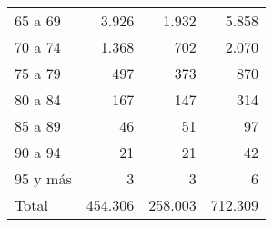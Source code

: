 \begin{tabular}{llll}
\multicolumn{1}{l}{\hspace{1em}65 a 69} &
  \multicolumn{1}{|r}{3.926} &
  \multicolumn{1}{r}{1.932} &
  \multicolumn{1}{r}{5.858} \\
\multicolumn{1}{l}{\hspace{1em}70 a 74} &
  \multicolumn{1}{|r}{1.368} &
  \multicolumn{1}{r}{702} &
  \multicolumn{1}{r}{2.070} \\
\multicolumn{1}{l}{\hspace{1em}75 a 79} &
  \multicolumn{1}{|r}{497} &
  \multicolumn{1}{r}{373} &
  \multicolumn{1}{r}{870} \\
\multicolumn{1}{l}{\hspace{1em}80 a 84} &
  \multicolumn{1}{|r}{167} &
  \multicolumn{1}{r}{147} &
  \multicolumn{1}{r}{314} \\
\multicolumn{1}{l}{\hspace{1em}85 a 89} &
  \multicolumn{1}{|r}{46} &
  \multicolumn{1}{r}{51} &
  \multicolumn{1}{r}{97} \\
\multicolumn{1}{l}{\hspace{1em}90 a 94} &
  \multicolumn{1}{|r}{21} &
  \multicolumn{1}{r}{21} &
  \multicolumn{1}{r}{42} \\
\multicolumn{1}{l}{\hspace{1em}95 y más} &
  \multicolumn{1}{|r}{3} &
  \multicolumn{1}{r}{3} &
  \multicolumn{1}{r}{6} \\
\multicolumn{1}{l}{\hspace{1em}Total} &
  \multicolumn{1}{|r}{454.306} &
  \multicolumn{1}{r}{258.003} &
  \multicolumn{1}{r}{712.309} \\
\cline{1-4}
\end{tabular}
